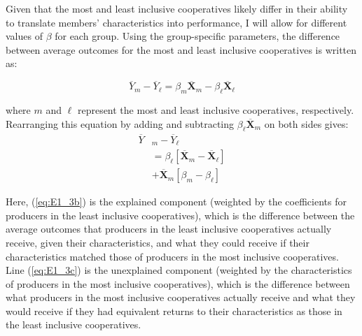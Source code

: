 \documentclass[11pt]{article}
\begin{document}
Given that the most and least inclusive cooperatives likely differ in their ability to translate members' characteristics into performance, I will allow for different values of $\beta$ for each group. Using the group-specific parameters, the difference between average outcomes for the most and least inclusive cooperatives is written as:

\begin{equation} \label{eq:E1_2}
        \overline{Y}_{m} - \overline{Y}_{\ell} =  \beta_{m}\overline{\mathbf{X}}_{m} - \beta_{\ell}\overline{\mathbf{X}}_{\ell}
\end{equation}  

where $m$ and $\ell$ represent the most and least inclusive cooperatives, respectively. Rearranging this equation by adding and subtracting $\beta_{\ell}\overline{\mathbf{X}}_{m}$ on both sides gives:
\begin{subequations}
    \begin{align}
        \overline{Y}&_{m} - \overline{Y}_{\ell} \label{eq:E1_3a} \\
                &= \beta_{\ell}[\overline{\mathbf{X}}_{m} - \overline{\mathbf{X}}_{\ell}] \label{eq:E1_3b} \\
                &+ \overline{\mathbf{X}}_{m}[\beta_{m} - \beta_{\ell}] \label{eq:E1_3c}
    \end{align}
\end{subequations}  

Here, (\ref{eq:E1_3b}) is the explained component (weighted by the coefficients for producers in the least inclusive cooperatives), which is the difference between the average outcomes that producers in the least inclusive cooperatives actually receive, given their characteristics, and what they could receive if their characteristics matched those of producers in the most inclusive cooperatives. %
Line (\ref{eq:E1_3c}) is the unexplained component (weighted by the characteristics of producers in the most inclusive cooperatives), which is the difference between what producers in the most inclusive cooperatives actually receive and what they would receive if they had equivalent returns to their characteristics as those in the least inclusive cooperatives.
\end{document}
